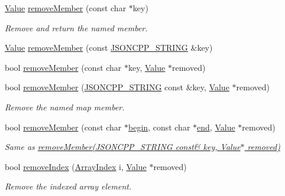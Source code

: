 \begin{DoxyCompactItemize}
\item 
\hyperlink{class_json_1_1_value}{Value} \hyperlink{class_json_1_1_value_aa52f7873b95d29627d6e83ba96f69aaa}{remove\+Member} (const char $\ast$key)
\begin{DoxyCompactList}\small\item\em Remove and return the named member. \end{DoxyCompactList}\item 
\hyperlink{class_json_1_1_value}{Value} \hyperlink{class_json_1_1_value_a1dfd5d30fbc53fcd9c4955b8b3e7885c}{remove\+Member} (const \hyperlink{config_8h_a1e723f95759de062585bc4a8fd3fa4be}{J\+S\+O\+N\+C\+P\+P\+\_\+\+S\+T\+R\+I\+NG} \&key)
\item 
bool \hyperlink{class_json_1_1_value_a708e599489adf30d65bf85a8ee16e6fb}{remove\+Member} (const char $\ast$key, \hyperlink{class_json_1_1_value}{Value} $\ast$removed)
\item 
bool \hyperlink{class_json_1_1_value_ae385ecef98427970df525ee876e9f54a}{remove\+Member} (\hyperlink{config_8h_a1e723f95759de062585bc4a8fd3fa4be}{J\+S\+O\+N\+C\+P\+P\+\_\+\+S\+T\+R\+I\+NG} const \&key, \hyperlink{class_json_1_1_value}{Value} $\ast$removed)
\begin{DoxyCompactList}\small\item\em Remove the named map member. \end{DoxyCompactList}\item 
bool \hyperlink{class_json_1_1_value_a49c91af727d6b4eb0af02a81bb2def87}{remove\+Member} (const char $\ast$\hyperlink{class_json_1_1_value_a015459a3950c198d63a2d3be8f5ae296}{begin}, const char $\ast$\hyperlink{class_json_1_1_value_a3e443cd0ef24f7e028b175e47ee045e0}{end}, \hyperlink{class_json_1_1_value}{Value} $\ast$removed)
\begin{DoxyCompactList}\small\item\em Same as \hyperlink{class_json_1_1_value_ae385ecef98427970df525ee876e9f54a}{remove\+Member(\+J\+S\+O\+N\+C\+P\+P\+\_\+\+S\+T\+R\+I\+N\+G const\& key, Value$\ast$ removed)} \end{DoxyCompactList}\item 
bool \hyperlink{class_json_1_1_value_ae9e67e08a85a2f3be3396ec0f4c47f65}{remove\+Index} (\hyperlink{class_json_1_1_value_a184a91566cccca7b819240f0d5561c7d}{Array\+Index} i, \hyperlink{class_json_1_1_value}{Value} $\ast$removed)
\begin{DoxyCompactList}\small\item\em Remove the indexed array element. \end{DoxyCompactList}\item 

\end{DoxyCompactItemize}
